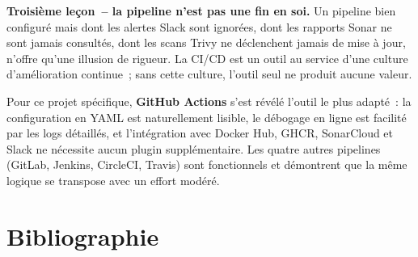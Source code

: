 \documentclass[12pt,a4paper]{report}
\begin{document}
\textbf{Troisième leçon~-- la pipeline n'est pas une fin en soi.} Un pipeline
bien configuré mais dont les alertes Slack sont ignorées, dont les rapports
Sonar ne sont jamais consultés, dont les scans Trivy ne déclenchent jamais de
mise à jour, n'offre qu'une illusion de rigueur. La CI/CD est un outil au
service d'une culture d'amélioration continue~; sans cette culture, l'outil
seul ne produit aucune valeur.

Pour ce projet spécifique, \textbf{GitHub Actions} s'est révélé l'outil le
plus adapté~: la configuration en YAML est naturellement lisible, le débogage
en ligne est facilité par les logs détaillés, et l'intégration avec Docker
Hub, GHCR, SonarCloud et Slack ne nécessite aucun plugin supplémentaire. Les
quatre autres pipelines (GitLab, Jenkins, CircleCI, Travis) sont fonctionnels
et démontrent que la même logique se transpose avec un effort modéré.

\chapter*{Bibliographie}
\end{document}
